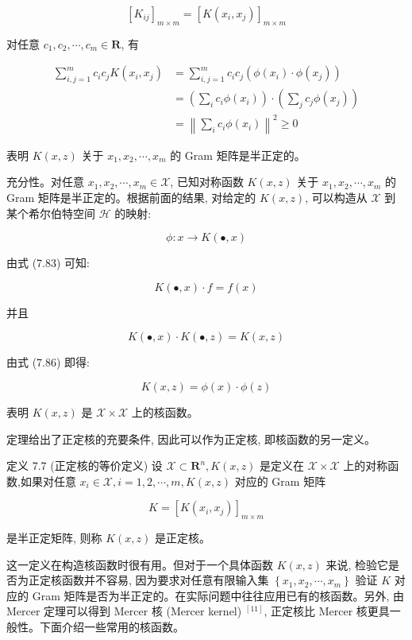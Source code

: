 \documentclass[10pt]{article}
\begin{document}
$$
\left[K_{i j}\right]_{m \times m}=\left[K\left(x_{i}, x_{j}\right)\right]_{m \times m}
$$

对任意 $c_{1}, c_{2}, \cdots, c_{m} \in \boldsymbol{R}$, 有

$$
\begin{aligned}
\sum_{i, j=1}^{m} c_{i} c_{j} K\left(x_{i}, x_{j}\right) & =\sum_{i, j=1}^{m} c_{i} c_{j}\left(\phi\left(x_{i}\right) \cdot \phi\left(x_{j}\right)\right) \\
& =\left(\sum_{i} c_{i} \phi\left(x_{i}\right)\right) \cdot\left(\sum_{j} c_{j} \phi\left(x_{j}\right)\right) \\
& =\left\|\sum_{i} c_{i} \phi\left(x_{i}\right)\right\|^{2} \geqslant 0
\end{aligned}
$$

表明 $K(x, z)$ 关于 $x_{1}, x_{2}, \cdots, x_{m}$ 的 Gram 矩阵是半正定的。

充分性。对任意 $x_{1}, x_{2}, \cdots, x_{m} \in \mathcal{X}$, 已知对称函数 $K(x, z)$ 关于 $x_{1}, x_{2}, \cdots, x_{m}$ 的 Gram 矩阵是半正定的。根据前面的结果, 对给定的 $K(x, z)$, 可以构造从 $\mathcal{X}$ 到某个希尔伯特空间 $\mathcal{H}$ 的映射:


\begin{equation*}
\phi: x \rightarrow K(\bullet, x) \tag{7.86}
\end{equation*}


由式 (7.83) 可知:

$$
K(\bullet, x) \cdot f=f(x)
$$

并且

$$
K(\bullet, x) \cdot K(\bullet, z)=K(x, z)
$$

由式 (7.86) 即得:

$$
K(x, z)=\phi(x) \cdot \phi(z)
$$

表明 $K(x, z)$ 是 $\mathcal{X} \times \mathcal{X}$ 上的核函数。

定理给出了正定核的充要条件, 因此可以作为正定核, 即核函数的另一定义。

定义 7.7 (正定核的等价定义) 设 $\mathcal{X} \subset \boldsymbol{R}^{n}, K(x, z)$ 是定义在 $\mathcal{X} \times \mathcal{X}$ 上的对称函数,如果对任意 $x_{i} \in \mathcal{X}, i=1,2, \cdots, m, K(x, z)$ 对应的 Gram 矩阵


\begin{equation*}
K=\left[K\left(x_{i}, x_{j}\right)\right]_{m \times m} \tag{7.87}
\end{equation*}


是半正定矩阵, 则称 $K(x, z)$ 是正定核。

这一定义在构造核函数时很有用。但对于一个具体函数 $K(x, z)$ 来说, 检验它是否为正定核函数并不容易, 因为要求对任意有限输入集 $\left\{x_{1}, x_{2}, \cdots, x_{m}\right\}$ 验证 $K$ 对应的 Gram 矩阵是否为半正定的。在实际问题中往往应用已有的核函数。另外, 由 Mercer 定理可以得到 Mercer 核 (Mercer kernel) ${ }^{[11]}$, 正定核比 Mercer 核更具一般性。下面介绍一些常用的核函数。
\end{document}
